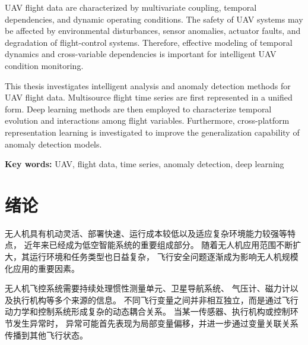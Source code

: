 \documentclass[
  degree=master,
  degree-type=academic
]{gzuthesis}
\begin{document}
UAV flight data are characterized by multivariate coupling, temporal
dependencies, and dynamic operating conditions. The safety of UAV systems
may be affected by environmental disturbances, sensor anomalies,
actuator faults, and degradation of flight-control systems. Therefore,
effective modeling of temporal dynamics and cross-variable dependencies
is important for intelligent UAV condition monitoring.

This thesis investigates intelligent analysis and anomaly detection
methods for UAV flight data. Multisource flight time series are first
represented in a unified form. Deep learning methods are then employed
to characterize temporal evolution and interactions among flight
variables. Furthermore, cross-platform representation learning is
investigated to improve the generalization capability of anomaly
detection models.

\noindent
\textbf{Key words:}
UAV, flight data, time series, anomaly detection, deep learning



\tableofcontents


\listoffigures
\listoftables



\mainmatter



\chapter{绪论}

无人机具有机动灵活、部署快速、运行成本较低以及适应复杂环境能力较强等特点，
近年来已经成为低空智能系统的重要组成部分。
随着无人机应用范围不断扩大，其运行环境和任务类型也日益复杂，
飞行安全问题逐渐成为影响无人机规模化应用的重要因素。

无人机飞控系统需要持续处理惯性测量单元、卫星导航系统、
气压计、磁力计以及执行机构等多个来源的信息。
不同飞行变量之间并非相互独立，而是通过飞行动力学和控制系统形成复杂的动态耦合关系。
当某一传感器、执行机构或控制环节发生异常时，
异常可能首先表现为局部变量偏移，并进一步通过变量关联关系传播到其他飞行状态。
\end{document}
